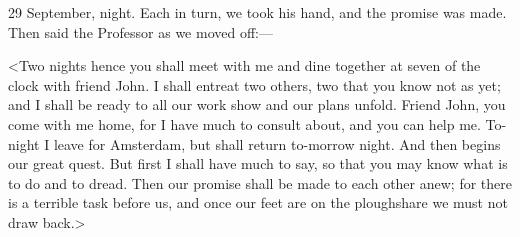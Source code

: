 \begin{diary}{29 September, night.}
Each in turn, we took his hand, and the promise was made. Then said the Professor as we moved off:—

<Two nights hence you shall meet with me and dine together at seven of the clock with friend John. I shall entreat two others, two that you know not as yet; and I shall be ready to all our work show and our plans unfold. Friend John, you come with me home, for I have much to consult about, and you can help me. To-night I leave for Amsterdam, but shall return to-morrow night. And then begins our great quest. But first I shall have much to say, so that you may know what is to do and to dread. Then our promise shall be made to each other anew; for there is a terrible task before us, and once our feet are on the ploughshare we must not draw back.>
\end{diary}